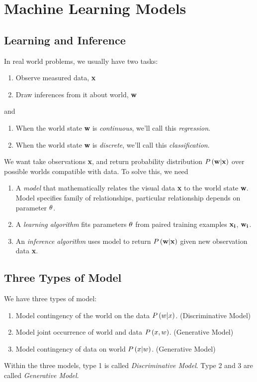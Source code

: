 \section{Machine Learning Models}
\label{section3.4}

\subsection{Learning and Inference}

In real world problems, we usually have two tasks:
	\begin{enumerate}
		\item Observe measured data, \textbf{x}
		\item Draw inferences from it about world, \textbf{w}
	\end{enumerate}
and
	\begin{enumerate}
		\item When the world state \textbf{w} is \textit{continuous}, we'll call this \textit{regression}.
		\item When the world state \textbf{w} is \textit{discrete}, we'll call this \textit{classification}.
	\end{enumerate}
We want take observations \textbf{x}, and return probability distribution $\P{\bf w|x}$ over possible worlds compatible with data. To solve this, we need
	\begin{enumerate}
		\item A \textit{model} that mathematically relates the visual data \textbf{x} to the world state \textbf{w}. Model specifies family of relationships, particular relationship depends on parameter ${\bf \th}$.
		\item A \textit{learning algorithm} fits parameters ${\bf \th}$ from paired training examples ${\bf x_i}$, ${\bf w_i}$.
		\item An \textit{inference algorithm} uses model to return $\P{\bf w|x}$ given new observation data \textbf{x}.
	\end{enumerate}

\subsection{Three Types of Model}

We have three types of model:
	\begin{enumerate}
		\item Model contingency of the world on the data $\P{w|x}$. (Discriminative Model)
		\item Model joint occurrence of world and data $\P{x,w}$. (Generative Model)
		\item Model contingency of data on world $\P{x|w}$. (Generative Model)
	\end{enumerate}
Within the three models, type 1 is called \textit{Discriminative Model}. Type 2 and 3 are called \textit{Generative Model}.


